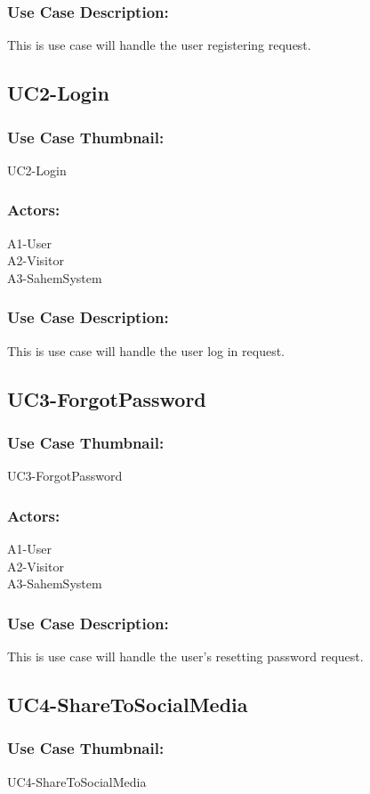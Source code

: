 \documentclass[11pt, openany]{report}
\begin{document}
\subsubsection*{Use Case Description:}
This is use case will handle the user registering request.

\subsection{UC2-Login}
\label{sUC2}
\subsubsection*{Use Case Thumbnail:}
UC2-Login
\subsubsection*{Actors:}
A1-User\\
A2-Visitor\\
A3-SahemSystem
\subsubsection*{Use Case Description:}
This is use case will handle the user log in request.

\subsection{UC3-ForgotPassword}
\label{sUC3}
\subsubsection*{Use Case Thumbnail:}
UC3-ForgotPassword
\subsubsection*{Actors:}
A1-User\\
A2-Visitor\\
A3-SahemSystem
\subsubsection*{Use Case Description:}
This is use case will handle the user's resetting password request. \\

\subsection{UC4-ShareToSocialMedia}
\label{sUC4}
\subsubsection*{Use Case Thumbnail:}
UC4-ShareToSocialMedia
\end{document}
